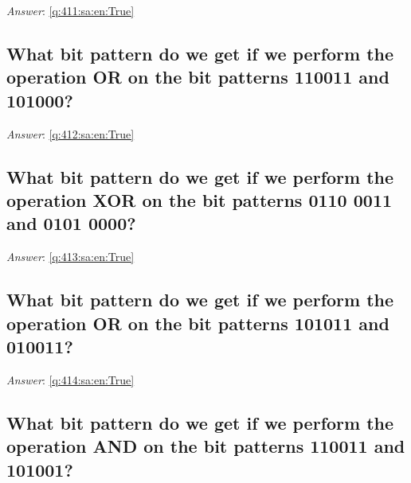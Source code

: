 \documentclass[a4paper,11pt,oneside]{article}
\begin{document}
\begin{sloppypar}
\vspace{1cm}

\textit{Answer}: \autoref{q:411:sa:en:True}



\subsection{What bit pattern do we get if we perform the operation OR on the bit patterns 110011 and 101000?}

\label{q:412:sa:en:False}

\vspace{2cm}

\noindent\makebox[\textwidth]{\hrulefill}

\vspace{1cm}

\textit{Answer}: \autoref{q:412:sa:en:True}



\subsection{What bit pattern do we get if we perform the operation XOR on the bit patterns 0110 0011 and 0101 0000?}

\label{q:413:sa:en:False}

\vspace{2cm}

\noindent\makebox[\textwidth]{\hrulefill}

\vspace{1cm}

\textit{Answer}: \autoref{q:413:sa:en:True}



\subsection{What bit pattern do we get if we perform the operation OR on the bit patterns 101011 and 010011?}

\label{q:414:sa:en:False}

\vspace{2cm}

\noindent\makebox[\textwidth]{\hrulefill}

\vspace{1cm}

\textit{Answer}: \autoref{q:414:sa:en:True}



\subsection{What bit pattern do we get if we perform the operation AND on the bit patterns 110011 and 101001?}


\end{sloppypar}
\end{document}

